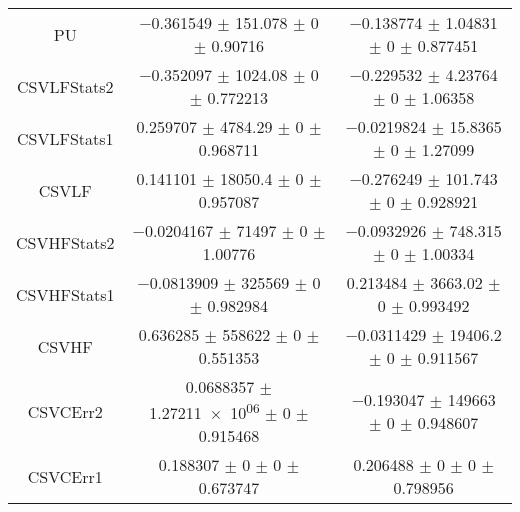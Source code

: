 \begin{table}
\begin{tabular}{ccc}
PU & \num{-0.361549} $\pm$ \num{151.078} $\pm$ \num{0} $\pm$ \num{0.90716} & \num{-0.138774} $\pm$ \num{1.04831} $\pm$ \num{0} $\pm$ \num{0.877451}\\
CSVLFStats2 & \num{-0.352097} $\pm$ \num{1024.08} $\pm$ \num{0} $\pm$ \num{0.772213} & \num{-0.229532} $\pm$ \num{4.23764} $\pm$ \num{0} $\pm$ \num{1.06358}\\
CSVLFStats1 & \num{0.259707} $\pm$ \num{4784.29} $\pm$ \num{0} $\pm$ \num{0.968711} & \num{-0.0219824} $\pm$ \num{15.8365} $\pm$ \num{0} $\pm$ \num{1.27099}\\
CSVLF & \num{0.141101} $\pm$ \num{18050.4} $\pm$ \num{0} $\pm$ \num{0.957087} & \num{-0.276249} $\pm$ \num{101.743} $\pm$ \num{0} $\pm$ \num{0.928921}\\
CSVHFStats2 & \num{-0.0204167} $\pm$ \num{71497} $\pm$ \num{0} $\pm$ \num{1.00776} & \num{-0.0932926} $\pm$ \num{748.315} $\pm$ \num{0} $\pm$ \num{1.00334}\\
CSVHFStats1 & \num{-0.0813909} $\pm$ \num{325569} $\pm$ \num{0} $\pm$ \num{0.982984} & \num{0.213484} $\pm$ \num{3663.02} $\pm$ \num{0} $\pm$ \num{0.993492}\\
CSVHF & \num{0.636285} $\pm$ \num{558622} $\pm$ \num{0} $\pm$ \num{0.551353} & \num{-0.0311429} $\pm$ \num{19406.2} $\pm$ \num{0} $\pm$ \num{0.911567}\\
CSVCErr2 & \num{0.0688357} $\pm$ \num{1.27211e+06} $\pm$ \num{0} $\pm$ \num{0.915468} & \num{-0.193047} $\pm$ \num{149663} $\pm$ \num{0} $\pm$ \num{0.948607}\\
CSVCErr1 & \num{0.188307} $\pm$ \num{0} $\pm$ \num{0} $\pm$ \num{0.673747} & \num{0.206488} $\pm$ \num{0} $\pm$ \num{0} $\pm$ \num{0.798956}\\
\bottomrule
\end{tabular}
\end{table}